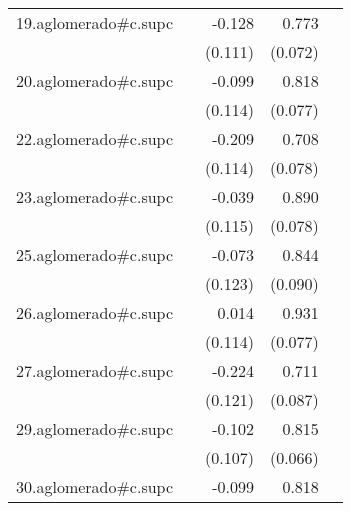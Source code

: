 {\begin{longtable}{l*{4}{D{.}{.}{-1}}}
\addlinespace
19.aglomerado#c.supc&                     &      -0.128         &       0.773\sym{***}&                     \\
            &                     &     (0.111)         &     (0.072)         &                     \\
\addlinespace
20.aglomerado#c.supc&                     &      -0.099         &       0.818\sym{***}&                     \\
            &                     &     (0.114)         &     (0.077)         &                     \\
\addlinespace
22.aglomerado#c.supc&                     &      -0.209         &       0.708\sym{***}&                     \\
            &                     &     (0.114)         &     (0.078)         &                     \\
\addlinespace
23.aglomerado#c.supc&                     &      -0.039         &       0.890\sym{***}&                     \\
            &                     &     (0.115)         &     (0.078)         &                     \\
\addlinespace
25.aglomerado#c.supc&                     &      -0.073         &       0.844\sym{***}&                     \\
            &                     &     (0.123)         &     (0.090)         &                     \\
\addlinespace
26.aglomerado#c.supc&                     &       0.014         &       0.931\sym{***}&                     \\
            &                     &     (0.114)         &     (0.077)         &                     \\
\addlinespace
27.aglomerado#c.supc&                     &      -0.224         &       0.711\sym{***}&                     \\
            &                     &     (0.121)         &     (0.087)         &                     \\
\addlinespace
29.aglomerado#c.supc&                     &      -0.102         &       0.815\sym{***}&                     \\
            &                     &     (0.107)         &     (0.066)         &                     \\
\addlinespace
30.aglomerado#c.supc&                     &      -0.099         &       0.818\sym{***}&                     \\

\end{longtable}}
